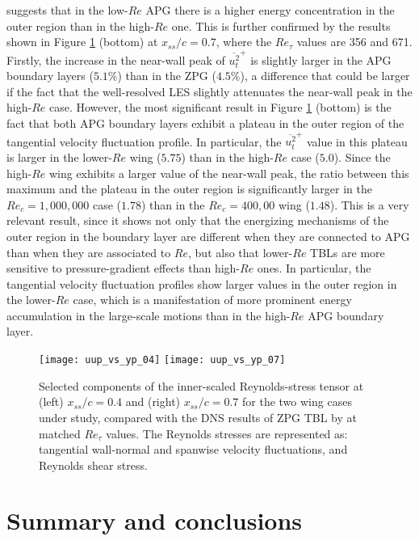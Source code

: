 suggests that in the low-$Re$ APG there is a higher energy concentration in the outer region than in the high-$Re$ one. This is further confirmed by the results shown in Figure \ref{uup_vs_yp} (bottom) at $x_{ss}/c=0.7$, where the $Re_{\tau}$ values are 356 and 671. Firstly, the increase in the near-wall peak of $\overline{u^{2}_{t}}^{+}$ is slightly larger in the APG boundary layers ($5.1\%$) than in the ZPG ($4.5\%$), a difference that could be larger if the fact that the well-resolved LES slightly attenuates the near-wall peak in the high-$Re$ case. However, the most significant result in Figure \ref{uup_vs_yp} (bottom) is the fact that both APG boundary layers exhibit a plateau in the outer region of the tangential velocity fluctuation profile. In particular, the $\overline{u^{2}_{t}}^{+}$ value in this plateau is larger in the lower-$Re$ wing ($5.75$) than in the high-$Re$ case ($5.0$). Since the high-$Re$ wing exhibits a larger value of the near-wall peak, the ratio between this maximum and the plateau in the outer region is significantly larger in the $Re_{c}=1,000,000$ case ($1.78$) than in the $Re_{c}=400,00$ wing ($1.48$). This is a very relevant result, since it shows not only that the energizing mechanisms of the outer region in the boundary layer are different when they are connected to APG than when they are associated to $Re$, but also that lower-$Re$ TBLs are more sensitive to pressure-gradient effects than high-$Re$ ones. In particular, the tangential velocity fluctuation profiles show larger values in the outer region in the lower-$Re$ case, which is a manifestation of more prominent energy accumulation in the large-scale motions than in the high-$Re$ APG boundary layer.
\begin{figure}[t]
\centering
\texttt{[image: uup\_vs\_yp\_04]}
\texttt{[image: uup\_vs\_yp\_07]}
\caption{Selected components of the inner-scaled Reynolds-stress tensor at (left) $x_{ss}/c=0.4$ and (right) $x_{ss}/c=0.7$ for the two wing cases under study, compared with the DNS results of ZPG TBL by \cite{schlatter_orlu10} at matched $Re_{\tau}$ values. The Reynolds stresses are represented as: {\color{blue}\solid} tangential {\color{red}\solid} wall-normal and {\color{green}\solid} spanwise velocity fluctuations, and {\color{cyan}\solid} Reynolds shear stress.}
\label{uup_vs_yp}
\end{figure}

\section{Summary and conclusions}

